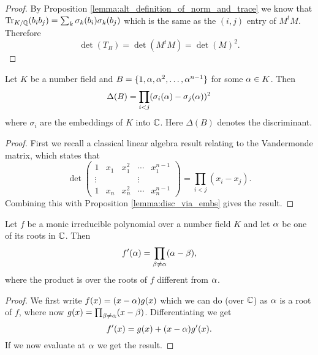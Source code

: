 \begin{proof}
	By Proposition \ref{lemma:alt_definition_of_norm_and_trace} we know that  $\operatorname{Tr}_{K/\mathbb{Q}}(b_i b_j)= \sum_k \sigma_k(b_i)\sigma_k(b_j)$ which is the same as the $(i,j)$ entry of $M^t M$. Therefore \[\det(T_B)=\det(M^t M)=\det(M)^2.\]
\end{proof}

\begin{lemma}\label{lemma:disc_of_prim_elt_basis}
	Let $K$ be a number field and $B=\{1,\alpha,\alpha^2,\dots,\alpha^{n-1}\}$ for some $\alpha \in K$. Then \[\Delta(B)=\prod_{i < j} (\sigma_i(\alpha)-\sigma_j(\alpha))^2\] where $\sigma_i$ are the embeddings of $K $ into $\mathbb{C}$. Here $\Delta(B)$ denotes the discriminant.
\end{lemma}
\begin{proof}
	First we recall a classical linear algebra result relating to the Vandermonde matrix, which states that  \[\det \left (\begin{matrix} 1 & x_1& x_1^2&\cdots&x_1^{n-1} \\ \vdots & & & \vdots \\   1 & x_n& x_n^2&\cdots&x_n^{n-1}
	\end{matrix} \right ) =\prod_{i<j} (x_i-x_j).\] Combining this with Proposition \ref{lemma:disc_via_embs} gives the result.
\end{proof}

\begin{lemma}\label{lemma:diff_of_irr_pol}
	Let $f$ be a monic irreducible polynomial over a number field $K$ and let $\alpha$ be one of its roots in $\mathbb{C}$. Then \[f'(\alpha)=\prod_{\beta \neq \alpha} (\alpha-\beta),  \] where the product is over the roots of $f$ different from $\alpha$.
\end{lemma}

\begin{proof}
	We first write $f(x)=(x-\alpha)g(x)$ which we can do (over $\mathbb{C}$) as $\alpha$ is a root of $f$, where now $g(x)=\prod_{\beta \neq \alpha} (x-\beta)$. Differentiating we get \[f'(x)=g(x)+(x-\alpha)g'(x).\] If we now evaluate at $\alpha$ we get the result.
\end{proof}

